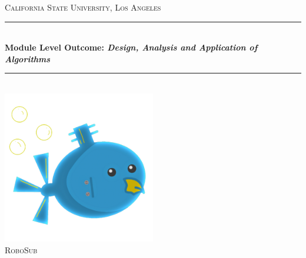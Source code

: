 \documentclass[11pt]{article}
\begin{document}
\begin{titlepage} 

	\newcommand{\HRule}{\rule{\linewidth}{0.5mm}} 
	\center %

	\textsc{\LARGE California State University, Los Angeles}\\[1.5cm] 

	\HRule\\[0.4cm]
    {\huge\bfseries Module Level Outcome: \emph{Design, Analysis and
    Application of Algorithms}}\\[0.4cm] \HRule\\[1.5cm]

	\vfill\vfill
	\includegraphics[width=0.5\textwidth]{../../ReportTemplate/robosub_logo.png}\\[1cm] 

	\textsc{\Large RoboSub}\\[0.5cm] 


\end{titlepage}
\end{document}
